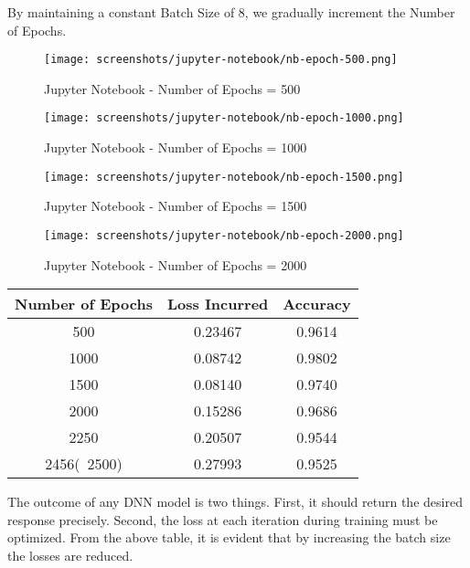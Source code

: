 By maintaining a constant Batch Size of 8, we gradually increment the Number of Epochs.

\begin{figure}[H]
    \centering
    \texttt{[image: screenshots/jupyter-notebook/nb-epoch-500.png]}
    \caption{Jupyter Notebook - Number of Epochs = 500}
\end{figure}

\begin{figure}[H]
    \centering
    \texttt{[image: screenshots/jupyter-notebook/nb-epoch-1000.png]}
    \caption{Jupyter Notebook - Number of Epochs = 1000}
\end{figure}

\begin{figure}[H]
    \centering
    \texttt{[image: screenshots/jupyter-notebook/nb-epoch-1500.png]}
    \caption{Jupyter Notebook - Number of Epochs = 1500}
\end{figure}

\begin{figure}[H]
    \centering
    \texttt{[image: screenshots/jupyter-notebook/nb-epoch-2000.png]}
    \caption{Jupyter Notebook - Number of Epochs = 2000}
\end{figure}

\begin{center}
    \begin{tabular}{ |c|c|c| } 
        \hline
        Number of Epochs & Loss Incurred & Accuracy \\ [0.5ex]
        \hline\hline
        500 & 0.23467 & 0.9614 \\
        1000 & 0.08742 & 0.9802 \\
        1500 & 0.08140 & 0.9740 \\
        2000 & 0.15286 & 0.9686 \\
        2250 & 0.20507 & 0.9544 \\
        2456(~2500) & 0.27993 & 0.9525 \\
        \hline
    \end{tabular}
    \label{tbl:nicetablelesstable}
\end{center}

The outcome of any DNN model is two things. First, it should return the desired response precisely. Second, the loss at each iteration during training must be optimized. From the above table, it is evident that by increasing the batch size the losses are reduced.

